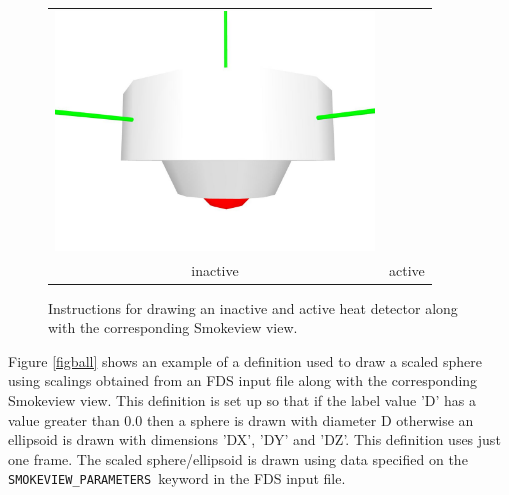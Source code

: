 \documentclass[11pt,twoside]{book}
\newcommand{\figoptions}{hbp}
\newcommand{\figheightA}{2.5in}
\begin{document}
\begin{figure}[\figoptions]
\begin{center}
\begin{tabular}{cc}
 \includegraphics[height=\figheightA]{figures/heatdetector_act}\\
inactive&active\\
 \end{tabular}
 \end{center}
\caption{Instructions for drawing an inactive and active heat detector
along with the corresponding Smokeview view.}
\label{figsprinkler}%
\end{figure}

Figure \ref{figball} shows an example of a definition used to draw a scaled sphere
using scalings obtained from an FDS input file along with the corresponding Smokeview
view.  This definition is set up so that if the label value 'D' has a value greater than 0.0
then a sphere is drawn with diameter D otherwise an ellipsoid is drawn with dimensions 'DX', 'DY' and 'DZ'.
This definition uses just one frame. The scaled sphere/ellipsoid is drawn using data
specified on the {\tt SMOKEVIEW\_PARAMETERS}\ keyword in the FDS input file.
\end{document}
